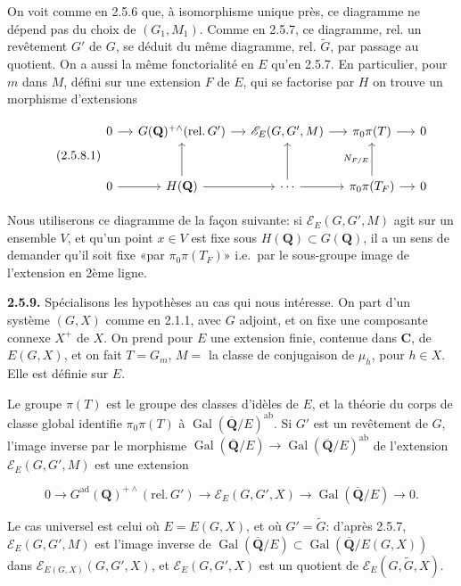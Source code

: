\documentclass[10pt,a4paper]{article}
\begin{document}
On voit comme en 2.5.6 que, à isomorphisme unique près, ce diagramme ne dépend pas du choix de \((G_1,M_1)\). Comme en 2.5.7, ce diagramme, rel. un revêtement \(G'\) de \(G\), se déduit du même diagramme, rel. \(\widetilde G\), par passage au quotient. On a aussi la même fonctorialité en \(E\) qu'en 2.5.7. En particulier, pour \(m\) dans \(M\), défini sur une extension \(F\) de \(E\), qui se factorise par \(H\) on trouve un morphisme d'extensions

\[
\tag{2.5.8.1}
\begin{tikzcd}[column sep=small,row sep=large]
0 \arrow[r] & G(\mathbf Q)^{+\wedge}(\mathrm{rel.}\,G') \arrow[r] & \mathscr E_E(G,G',M) \arrow[r] & \pi_0\pi(T) \arrow[r] & 0 \\
0 \arrow[r] & H(\mathbf Q) \arrow[r] \arrow[u] & \cdots \arrow[r] \arrow[u] & \pi_0\pi(T_F) \arrow[r] \arrow[u,"N_{F/E}"] & 0
\end{tikzcd}
\]

Nous utiliserons ce diagramme de la façon suivante: si \(\mathscr E_E(G,G',M)\) agit sur un ensemble \(V\), et qu'un point \(x\in V\) est fixe sous \(H(\mathbf Q)\subset G(\mathbf Q)\), il a un sens de demander qu'il soit fixe «par \(\pi_0\pi(T_F)\)» i.e.~par le sous-groupe image de l'extension en 2ème ligne.

\textbf{2.5.9.} Spécialisons les hypothèses au cas qui nous intéresse. On part d'un système \((G,X)\) comme en 2.1.1, avec \(G\) adjoint, et on fixe une composante connexe \(X^+\) de \(X\). On prend pour \(E\) une extension finie, contenue dans \(\mathbf C\), de \(E(G,X)\), et on fait \(T=G_m\), \(M=\) la classe de conjugaison de \(\mu_h\), pour \(h\in X\). Elle est définie sur \(E\).

Le groupe \(\pi(T)\) est le groupe des classes d'idèles de \(E\), et la théorie du corps de classe global identifie \(\pi_0\pi(T)\) à \(\operatorname{Gal}(\overline{\mathbf Q}/E)^{\mathrm{ab}}\). Si \(G'\) est un revêtement de \(G\), l'image inverse par le morphisme \(\operatorname{Gal}(\overline{\mathbf Q}/E)\to\operatorname{Gal}(\overline{\mathbf Q}/E)^{\mathrm{ab}}\) de l'extension \(\mathscr E_E(G,G',M)\) est une extension

\[
0\longrightarrow G^{\mathrm{ad}}(\mathbf Q)^{+\wedge}(\mathrm{rel.}\,G')
\longrightarrow \mathscr E_E(G,G',X)
\longrightarrow \operatorname{Gal}(\overline{\mathbf Q}/E)
\longrightarrow0. \tag{2.5.9.1}
\]

Le cas universel est celui où \(E=E(G,X)\), et où \(G'=\widetilde G\): d'après 2.5.7, \(\mathscr E_E(G,G',M)\) est l'image inverse de \(\operatorname{Gal}(\overline{\mathbf Q}/E)\subset\operatorname{Gal}(\overline{\mathbf Q}/E(G,X))\) dans \(\mathscr E_{E(G,X)}(G,G',X)\), et \(\mathscr E_E(G,G',X)\) est un quotient de \(\mathscr E_E(G,\widetilde G,X)\).
\end{document}
